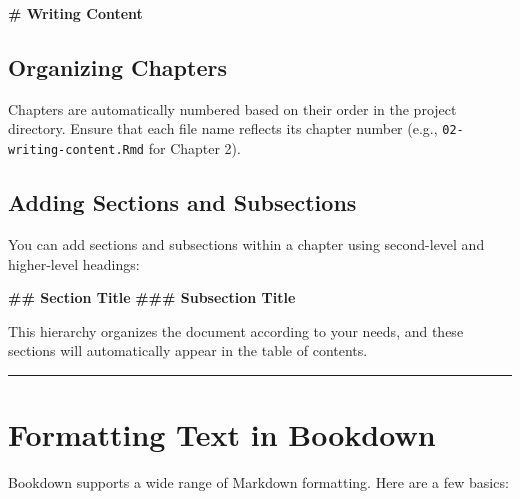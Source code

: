 \documentclass[
]{book}
\newenvironment{Shaded}{\begin{snugshade}}{\end{snugshade}}
\newcommand{\FunctionTok}[1]{\textcolor[rgb]{0.13,0.29,0.53}{\textbf{#1}}}
\theoremstyle{definition}
\theoremstyle{definition}
\theoremstyle{definition}
\theoremstyle{definition}
\theoremstyle{remark}
\begin{document}
\begin{Shaded}
\begin{Highlighting}[]
\FunctionTok{\# Writing Content}
\end{Highlighting}
\end{Shaded}

\subsection{Organizing Chapters}\label{organizing-chapters}

Chapters are automatically numbered based on their order in the project directory. Ensure that each file name reflects its chapter number (e.g., \texttt{02-writing-content.Rmd} for Chapter 2).

\subsection{Adding Sections and Subsections}\label{adding-sections-and-subsections}

You can add sections and subsections within a chapter using second-level and higher-level headings:

\begin{Shaded}
\begin{Highlighting}[]
\FunctionTok{\#\# Section Title}
\FunctionTok{\#\#\# Subsection Title}
\end{Highlighting}
\end{Shaded}

This hierarchy organizes the document according to your needs, and these sections will automatically appear in the table of contents.

\begin{center}\rule{0.5\linewidth}{0.5pt}\end{center}

\section{Formatting Text in Bookdown}\label{formatting-text-in-bookdown}

Bookdown supports a wide range of Markdown formatting. Here are a few basics:
\end{document}
